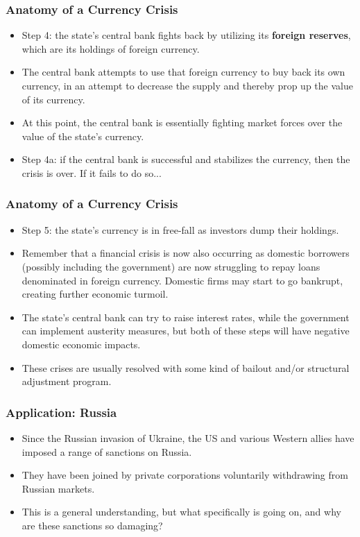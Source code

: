 \documentclass[handout]{beamer}
\begin{document}
\begin{frame} 
	\frametitle{\LARGE{Anatomy of a Currency Crisis}}
	\begin{itemize}
		\item Step 4: the state's central bank fights back by utilizing its \textbf{foreign reserves}, which are its holdings of foreign currency. \pause
		\item The central bank attempts to use that foreign currency to buy back its own currency, in an attempt to decrease the supply and thereby prop up the value of its currency. \pause
		\item At this point, the central bank is essentially fighting market forces over the value of the state's currency. \pause
		\item Step 4a: if the central bank is successful and stabilizes the currency, then the crisis is over. If it fails to do so...
	\end{itemize}
\end{frame}

\begin{frame} 
	\frametitle{\LARGE{Anatomy of a Currency Crisis}}
	\begin{itemize}
		\item Step 5: the state's currency is in free-fall as investors dump their holdings.
		\item Remember that a financial crisis is now also occurring as domestic borrowers (possibly including the government) are now struggling to repay loans denominated in foreign currency. Domestic firms may start to go bankrupt, creating further economic turmoil.  \pause
		\item The state's central bank can try to raise interest rates, while the government can implement austerity measures, but both of these steps will have negative domestic economic impacts.
		\item These crises are usually resolved with some kind of bailout and/or structural adjustment program.
	\end{itemize}
\end{frame}

\begin{frame} 
	\frametitle{\LARGE{Application: Russia}}
	\begin{itemize}
		\item Since the Russian invasion of Ukraine, the US and various Western allies have imposed a range of sanctions on Russia. \pause
		\item They have been joined by private corporations voluntarily withdrawing from Russian markets. \pause
		\item This is a general understanding, but what specifically is going on, and why are these sanctions so damaging?
	\end{itemize}
\end{frame}
\end{document}
